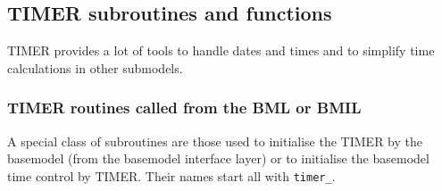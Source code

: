 \documentclass[twoside]{article}
\begin{document}
\subsection{TIMER subroutines and functions}
TIMER provides a lot of tools to handle dates and times and to simplify
time calculations in other submodels.

\subsubsection{TIMER routines called from the BML or BMIL}
%
A special class of subroutines are
those used to initialise the TIMER by the basemodel (from the basemodel
interface layer) or to initialise the basemodel time control by TIMER.
Their names start all with \verb|timer_|.
%
\end{document}
